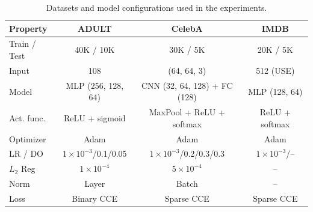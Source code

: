 \documentclass[acmsmall]{acmart}
\begin{document}
\begin{table}[!t]
    \footnotesize
    \centering
    \begin{tabular}{|l||c|c|c|}
        \hline
        \textbf{Property} & \textbf{ADULT} & \textbf{CelebA} & \textbf{IMDB} \\
        \hline\hline
        Train / Test & 40K / 10K & 30K / 5K & 20K / 5K \\
        \hline
        Input & 108 & (64, 64, 3) & 512 (USE) \\
        Model & MLP (256, 128, 64) & CNN (32, 64, 128) + FC (128) & MLP (128, 64) \\
        Act. func. & ReLU + sigmoid & MaxPool + ReLU + softmax & ReLU + softmax \\
        Optimizer & Adam & Adam & Adam \\
        LR / DO & $1\times10^{-3}$/0.1/0.05 & $1\times10^{-3}$/0.2/0.3/0.3 & $1\times10^{-3}$/-- \\
        $L_2$ Reg & $1\times10^{-4}$ & $5\times10^{-4}$ & -- \\
        Norm & Layer & Batch & -- \\
        Loss & Binary CCE & Sparse CCE & Sparse CCE \\
        \hline
    \end{tabular}
    \caption{Datasets and model configurations used in the experiments. }
    \label{tab:hyper}
\end{table}
\end{document}
